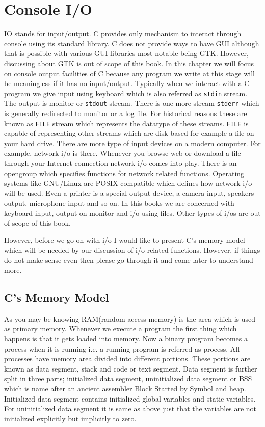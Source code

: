 \chapter{Console I/O}
IO stands for input/output. C provides only mechanism to interact through
console using its standard library. C does not provide ways to have GUI
although that is possible with various GUI libraries most notable being
GTK. However, discussing about GTK is out of scope of this book. In this
chapter we will focus on console output facilities of C because any program we
write at this stage will be meaningless if it has no input/output. Typically
when we interact with a C program we give input using keyboard which is also
referred as \texttt{stdin} stream. The output is monitor or \texttt{stdout}
stream. There is one more stream \texttt{stderr} which is generally redirected
to monitor or a log file. For historical reasons these are known as
\texttt{FILE} stream which represents the datatype of these
streams. \texttt{FILE} is capable of representing other streams which are disk
based for example a file on your hard drive. There are more type of input
devices on a modern computer. For example, network i/o is there. Whenever you
browse web or download a file through your Internet connection network i/o comes
into play. There is an opengroup
which specifies functions for network related functions. Operating systems
like GNU/Linux are POSIX compatible which defines how network i/o will be
used. Even a printer is a special output device, a camera input, speakers
output, microphone input and so on. In this books we are concerned with
keyboard input, output on monitor and i/o using files. Other types of i/os are
out of scope of this book.

However, before we go on with i/o I would
like to present C's memory model which will be needed by our discussion of i/o
related functions. However, if things do not make sense even then please go
through it and come later to understand more. 

\section{C's Memory Model}
As you may be knowing RAM(random access memory) is the area which is used as
primary memory. Whenever we execute a program the first thing which happens is
that it gets loaded into memory. Now a binary program becomes a process when it
is running i.e. a running program is referred as process. All processes have
memory area divided into different portions. These portions are known as data
segment, stack and code or text segment. Data segment is further split in
three parts; initialized data segment, uninitialized data segment or BSS which
is name after an ancient assembler Block Started by Symbol and
heap. Initialized data segment contains initialized global variables and static
variables. For uninitialized data segment it is same as above just that the
variables are not initialized explicitly but implicitly to zero.

